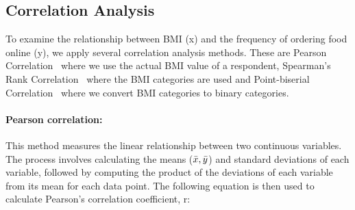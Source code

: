 \documentclass[a4paper,fleqn]{cas-sc}
\begin{document}





\subsection{Correlation Analysis}

To examine the relationship between BMI (x) and the frequency of ordering food online (y), we apply several correlation analysis methods. These are Pearson Correlation~\cite{pearson} where we use the actual BMI value of a respondent, Spearman's Rank Correlation~\cite{spearman} where the BMI categories are used and Point-biserial Correlation~\cite{point_biserial} where we convert BMI categories to binary categories. 


\paragraph{Pearson correlation:}
This method measures the linear relationship between two continuous variables. The process involves calculating the means ($\bar{x}, \Bar{y}$) and standard deviations of each variable, followed by computing the product of the deviations of each variable from its mean for each data point. The following equation is then used to calculate Pearson's correlation coefficient, r: 
\end{document}

